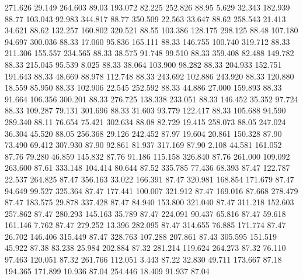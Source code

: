  271.626   29.149  264.603        89.03
 193.072   82.225  252.826        88.95
   5.629   32.343  182.939        88.77
 103.043   92.983  344.817        88.77
 350.509   22.563   33.647        88.62
 258.543   21.413   34.621        88.62
 132.257  160.802  320.521        88.55
 103.386  128.175  298.125        88.48
 107.180   94.697  300.036        88.33
  17.060   95.836  165.111        88.33
 146.755  100.740  319.712        88.33
 211.306  155.557  234.565        88.33
  38.575   91.748   99.510        88.33
 359.408   82.488  149.782        88.33
 215.045   95.539    8.025        88.33
  38.064  103.900   98.282        88.33
 204.933  152.751  191.643        88.33
  48.669   88.978  112.748        88.33
 243.692  102.886  243.920        88.33
 120.880   18.559   85.950        88.33
 102.906   22.545  252.592        88.33
  44.886   27.000  159.893        88.33
  91.664  106.356  300.201        88.33
 276.725  138.338  233.051        88.33
 146.452   35.352   97.724        88.33
 109.287   79.131  301.696        88.33
  31.603   93.779  122.417        88.33
 105.688   94.590  289.340        88.11
  76.654   75.421  302.634        88.08
  82.729   19.415  258.073        88.05
 247.024   36.304   45.520        88.05
 256.368   29.126  242.452        87.97
  19.604   20.861  150.328        87.90
  73.490   69.412  307.930        87.90
  92.861   81.937  317.169        87.90
   2.108   44.581  161.052        87.76
  79.280   46.859  145.832        87.76
  91.186  115.158  326.840        87.76
 261.000  109.092  263.600        87.61
 333.148  104.414   80.644        87.52
 335.785   77.436   68.393        87.47
 122.787   22.537  264.825        87.47
 356.163   33.022  166.391        87.47
 320.981  168.854  171.679        87.47
  94.649   99.527  325.364        87.47
 177.441  100.007  321.912        87.47
 169.016   87.668  278.479        87.47
 183.575   29.878  337.428        87.47
  84.940  153.800  321.040        87.47
 311.218  152.603  257.862        87.47
 280.293  145.163   35.789        87.47
 224.091   90.437   65.816        87.47
  59.618  161.146    7.762        87.47
 279.252   13.396  282.095        87.47
 314.655   76.885  171.774        87.47
  26.702  146.406  315.449        87.47
 328.763  107.288  207.861        87.43
 305.595  151.519   45.922        87.38
  83.238   25.984  202.884        87.32
 281.214  119.624  264.273        87.32
  76.110   97.463  120.051        87.32
 261.766  112.051    3.443        87.22
  32.830   49.711  173.667        87.18
 194.365  171.899   10.936        87.04
 254.446   18.409   91.937        87.04

